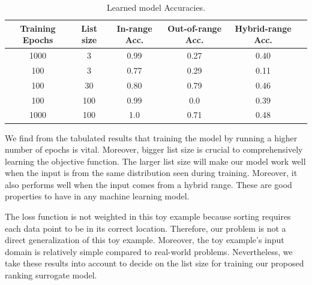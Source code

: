 \documentclass[12pt, twoside, ngerman]{report}
\begin{document}
\begin{table} [h!]
\centering
\resizebox{\linewidth}{!} {
\begin{tabular}{ | c | c | c | c | c | c | }
\hline
\textbf{Training Epochs} & \textbf{List size} & \textbf{In-range Acc.} & \textbf{Out-of-range Acc.} & \textbf{Hybrid-range Acc.} \\ [0.5 ex]
\hline \hline
1000 & 3 & 0.99 & 0.27 & 0.40\\
100 & 3  & 0.77 & 0.29 & 0.11\\
100 & 30  & 0.80 & 0.79 & 0.46\\
100 & 100  & 0.99 & 0.0 & 0.39\\
1000 & 100  & 1.0 & 0.71 & 0.48\\
\hline
\end{tabular}
}
\caption{Learned model Accuracies.}
\label {table:caseStudyResults}
\end{table}

We find from the tabulated results that training the model by running a higher number of epochs is vital.
Moreover, bigger list size is crucial to comprehensively learning the objective function.
The larger list size will make our model work well when the input is from the same distribution seen during training.
Moreover,  it also performs well when the input comes from a hybrid range.
These are good properties to have in any machine learning model.

The loss function is not weighted in this toy example because sorting requires each data point to be in its correct location.
Therefore,  our problem is not a direct generalization of this toy example.
Moreover, the toy example's input domain is relatively simple compared to real-world problems.
Nevertheless,  we take these results into account to decide on the list size for training our proposed ranking surrogate model.



\iffalse
\end{document}
